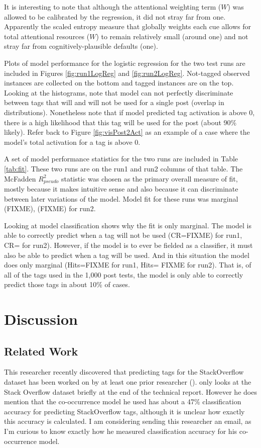 \documentclass[10pt,letterpaper]{article}
\begin{document}
It is interesting to note that although the attentional weighting term ($W$) was allowed to be calibrated by the regression, it did not stray far from one.
Apparently the scaled entropy measure that globally weights each cue allows for total attentional resources ($W$) to remain relatively small (around one) and not stray far from cognitively-plausible defaults (one).

Plots of model performance for the logistic regression for the two test runs are included in Figures \ref{fig:run1LogReg} and \ref{fig:run2LogReg}.
Not-tagged observed instances are collected on the bottom and tagged instances are on the top.
Looking at the histograms, note that model can not perfectly discriminate between tags that will and will not be used for a single post (overlap in distributions).
Nonetheless note that if model predicted tag activation is above 0, there is a high likelihood that this tag will be used for the post (about 90\% likely).
Refer back to Figure \ref{fig:visPost2Act} as an example of a case where the model's total activation for a tag is above 0.

A set of model performance statistics for the two runs are included in Table \ref{tab:fit}.
These two runs are on the run1 and run2 columns of that table.
The McFadden $R_{pseudo}^{2}$ statistic was chosen as the primary overall measure of fit, mostly because it makes intuitive sense and also because it can discriminate between later variations of the model.
Model fit for these runs was marginal (FIXME), (FIXME) for run2.

Looking at model classification shows why the fit is only marginal.
The model is able to correctly predict when a tag will not be used (CR=FIXME) for run1, CR= for run2).
However, if the model is to ever be fielded as a classifier, it must also be able to predict when a tag will be used.
And in this situation the model does only marginal (Hits=FIXME for run1, Hits= FIXME for run2).
That is, of all of the tags used in the 1,000 post tests, the model is only able to correctly predict those tags in about 10\% of cases.

\section{Discussion}

\subsection{Related Work}
This researcher recently discovered that predicting tags for the StackOverflow dataset has been worked on by at least one prior researcher (\cite{Kuo2011}).
\cite{Kuo2011} only looks at the Stack Overflow dataset briefly at the end of the technical report.
However he does mention that the co-occurrence model he used has about a 47\% classification accuracy for predicting StackOverflow tags, although it is unclear how exactly this accuracy is calculated.
I am considering sending this researcher an email, as I'm curious to know exactly how he measured classification accuracy for his co-occurrence model.
\end{document}
